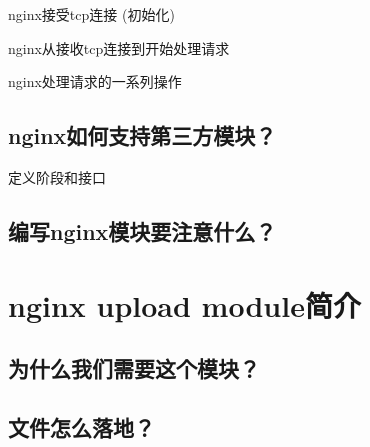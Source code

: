 \documentclass[aspectratio=169]{ctexbeamer}
\begin{document}
\begin{frame}{\subsecname}{nginx接受tcp连接 (初始化)}
  
\end{frame}

\begin{frame}{\subsecname}{nginx从接收tcp连接到开始处理请求}
  
  
  
\end{frame}

\begin{frame}{\subsecname}{nginx处理请求的一系列操作}
  
  
\end{frame}

\subsection{nginx如何支持第三方模块？}
\begin{frame}{\subsecname}{定义阶段和接口}
\end{frame}

\subsection{编写nginx模块要注意什么？}
\begin{frame}{\subsecname}
\end{frame}

\section{nginx upload module简介}
\subsection{为什么我们需要这个模块？}
\subsection{文件怎么落地？}
\end{document}
